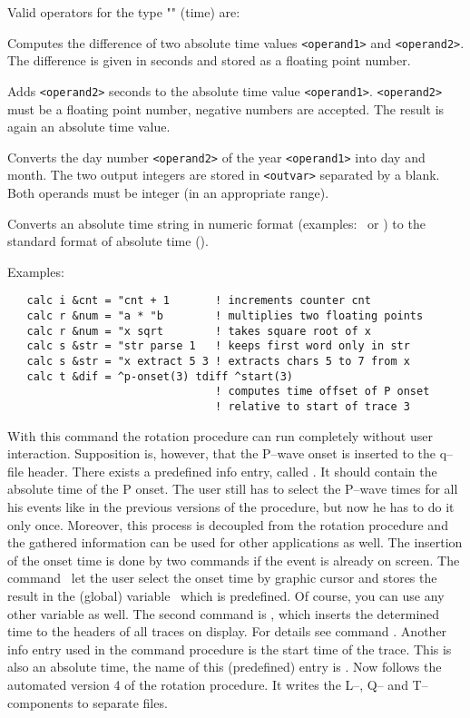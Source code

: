 \noindent
Valid operators for the type "" (time) are:
\begin{deflist}{}
\item[\exm{tdiff}]
   Computes the difference of two absolute time values
   \verb'<operand1>' and \verb'<operand2>'.  The difference is
   given in seconds and stored as a floating point number.
\item[\exm{tadd}]
   Adds \verb'<operand2>' seconds to the absolute time value
   \verb'<operand1>'.  \verb'<operand2>' must be a floating point
   number, negative numbers are accepted.  The result is again an
   absolute time value.
\item[\exm{cnv\_julian}]
   Converts the day number \verb'<operand2>' of the year
   \verb'<operand1>' into day and month.  The two output integers
   are stored in \verb'<outvar>' separated by a blank.
   Both operands must be integer (in an appropriate range).
\item[\exm{make\_time}]
   Converts an absolute time string in numeric format (examples:
   \ or
   )
   to the standard format of absolute time
   ().
\end{deflist}
\bigskip

\noindent
Examples:
\begin{verbatim}
   calc i &cnt = "cnt + 1       ! increments counter cnt
   calc r &num = "a * "b        ! multiplies two floating points
   calc r &num = "x sqrt        ! takes square root of x
   calc s &str = "str parse 1   ! keeps first word only in str
   calc s &str = "x extract 5 3 ! extracts chars 5 to 7 from x
   calc t &dif = ^p-onset(3) tdiff ^start(3)
                                ! computes time offset of P onset
                                ! relative to start of trace 3
\end{verbatim}

With this command the rotation procedure can run completely
without user interaction.  Supposition is, however, that the
P--wave onset is inserted to the q--file header.  There exists
a predefined info entry, called .  It should contain
the absolute time of the P onset.  The user still has to select
the P--wave times for all his events like in the previous versions
of the procedure, but now he has to do it only once.  Moreover, this
process is decoupled from the rotation procedure and the gathered
information can be used for other applications as well.  The
insertion of the onset time is done by two commands if the event
is already on screen.  The command \ let the user
select the onset time by graphic cursor and stores the result
in the (global) variable \ which is predefined.  Of course,
you can use any other variable as well.  The second command is
, which inserts the determined time
to the headers of all traces on display.  For details see command
.  Another info entry used in the command procedure is the
start time of the trace.
This is also an absolute time, the name of this (predefined) entry
is .  Now follows the automated version 4 of the rotation
procedure.  It writes the L--, Q-- and T--components to separate
files.

